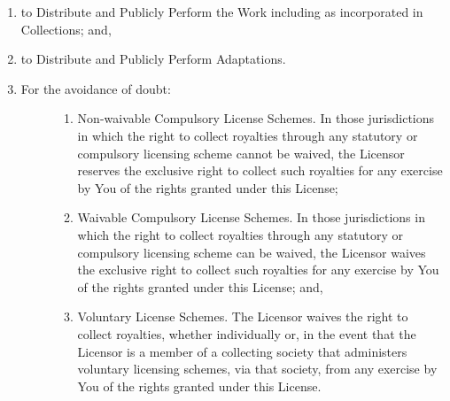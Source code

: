 \documentclass[letterpaper,10pt,english]{manual}
\begin{document}
\begin{enumerate}
\begin{enumerate}
\item {} 
to Distribute and Publicly Perform the Work including as incorporated in Collections; and,

\item {} 
to Distribute and Publicly Perform Adaptations.

\item {} \begin{description}
\item[For the avoidance of doubt:] \leavevmode\begin{enumerate}
\item {} 
Non-waivable Compulsory License Schemes. In those jurisdictions in which the right to collect royalties through any statutory or compulsory licensing scheme cannot be waived, the Licensor reserves the exclusive right to collect such royalties for any exercise by You of the rights granted under this License;

\item {} 
Waivable Compulsory License Schemes. In those jurisdictions in which the right to collect royalties through any statutory or compulsory licensing scheme can be waived, the Licensor waives the exclusive right to collect such royalties for any exercise by You of the rights granted under this License; and,

\item {} 
Voluntary License Schemes. The Licensor waives the right to collect royalties, whether individually or, in the event that the Licensor is a member of a collecting society that administers voluntary licensing schemes, via that society, from any exercise by You of the rights granted under this License.

\end{enumerate}

\end{description}

\end{enumerate}

\end{enumerate}
\end{document}
